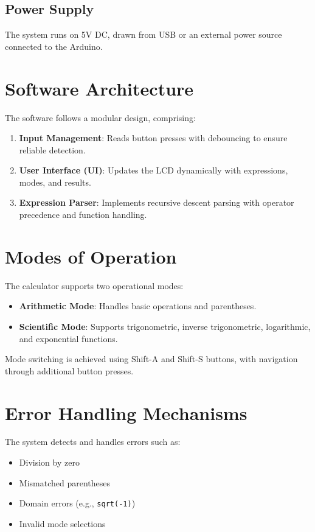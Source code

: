 \documentclass{article}
\theoremstyle{remark}
\begin{document}
\subsection{Power Supply}
The system runs on 5V DC, drawn from USB or an external power source connected to the Arduino.

\section{Software Architecture}
The software follows a modular design, comprising:
\begin{enumerate}[label=\alph*)]
    \item \textbf{Input Management}: Reads button presses with debouncing to ensure reliable detection.
    \item \textbf{User Interface (UI)}: Updates the LCD dynamically with expressions, modes, and results.
    \item \textbf{Expression Parser}: Implements recursive descent parsing with operator precedence and function handling.
\end{enumerate}

\section{Modes of Operation}
The calculator supports two operational modes:
\begin{itemize}[noitemsep]
    \item \textbf{Arithmetic Mode}: Handles basic operations and parentheses.
    \item \textbf{Scientific Mode}: Supports trigonometric, inverse trigonometric, logarithmic, and exponential functions.
\end{itemize}
Mode switching is achieved using Shift-A and Shift-S buttons, with navigation through additional button presses.

\section{Error Handling Mechanisms}
The system detects and handles errors such as:
\begin{itemize}[noitemsep]
    \item Division by zero
    \item Mismatched parentheses
    \item Domain errors (e.g., \texttt{sqrt(-1)})
    \item Invalid mode selections
\end{itemize}
\end{document}
